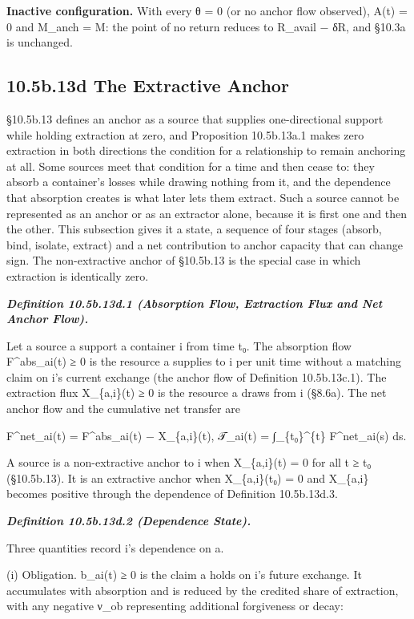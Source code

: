 \documentclass[
]{article}
\begin{document}
\textbf{Inactive configuration.} With every θ = 0 (or no anchor flow
observed), A(t) = 0 and M\_anch = M: the point of no return reduces to
R\_avail − δR, and §10.3a is unchanged.

\hypertarget{b.13d-the-extractive-anchor}{%
\subsection{10.5b.13d The Extractive
Anchor}\label{b.13d-the-extractive-anchor}}

§10.5b.13 defines an anchor as a source that supplies one-directional
support while holding extraction at zero, and Proposition 10.5b.13a.1
makes zero extraction in both directions the condition for a
relationship to remain anchoring at all. Some sources meet that
condition for a time and then cease to: they absorb a container's losses
while drawing nothing from it, and the dependence that absorption
creates is what later lets them extract. Such a source cannot be
represented as an anchor or as an extractor alone, because it is first
one and then the other. This subsection gives it a state, a sequence of
four stages (absorb, bind, isolate, extract) and a net contribution to
anchor capacity that can change sign. The non-extractive anchor of
§10.5b.13 is the special case in which extraction is identically zero.

\emph{\textbf{Definition 10.5b.13d.1 (Absorption Flow, Extraction Flux
and Net Anchor Flow).}}

Let a source a support a container i from time t₀. The absorption flow
F\^{}abs\_ai(t) ≥ 0 is the resource a supplies to i per unit time
without a matching claim on i's current exchange (the anchor flow of
Definition 10.5b.13c.1). The extraction flux X\_\{a,i\}(t) ≥ 0 is the
resource a draws from i (§8.6a). The net anchor flow and the cumulative
net transfer are

F\^{}net\_ai(t) = F\^{}abs\_ai(t) − X\_\{a,i\}(t), 𝒯\_ai(t) =
∫\_\{t₀\}\^{}\{t\} F\^{}net\_ai(s) ds.

A source is a non-extractive anchor to i when X\_\{a,i\}(t) = 0 for all
t ≥ t₀ (§10.5b.13). It is an extractive anchor when X\_\{a,i\}(t₀) = 0
and X\_\{a,i\} becomes positive through the dependence of Definition
10.5b.13d.3.

\emph{\textbf{Definition 10.5b.13d.2 (Dependence State).}}

Three quantities record i's dependence on a.

(i) Obligation. b\_ai(t) ≥ 0 is the claim a holds on i's future
exchange. It accumulates with absorption and is reduced by the credited
share of extraction, with any negative ν\_ob representing additional
forgiveness or decay:
\end{document}
